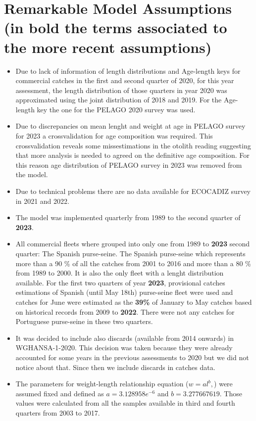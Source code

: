 \documentclass[review]{elsarticle}
\begin{document}
\section{Remarkable Model Assumptions (in bold the terms associated to the more recent assumptions)}\label{Remark}
\begin{itemize}
\item Due to lack of information of length distributions and Age-length keys for commercial catches in the first and second quarter of 2020, for this year assessment, the length distribution of those quarters in year 2020 was approximated using the joint distribution of 2018 and 2019. For the Age-length key the one for the PELAGO 2020 survey was used.
\item Due to discrepancies on mean lenght and weight at age in PELAGO survey for 2023 a crossvalidation for age composition was required. This crossvalidation reveals some missestimations in the otolith reading suggesting that more analysis is needed to agreed on the definitive age composition. For this reason age distribution of PELAGO survey in 2023 was removed from the model.
\item Due to technical problems there are no data available for ECOCADIZ survey in 2021 and 2022.
\item The model was implemented quarterly from 1989 to the second quarter of \textbf{2023}. 
\item All commercial fleets where grouped into only one from 1989 to \textbf{2023} second quarter: The Spanish purse-seine. The Spanish purse-seine which represents more than a 90 \% of all the catches from 2001 to 2016 and more than a 80 \% from 1989 to 2000. It is also the only fleet with a lenght distribution available. For the first two quarters of year \textbf{2023}, provisional catches estimations of Spanish (until May 18th) purse-seine fleet were used and catches for June were estimated as the \textbf{39\%} of January to May catches based on historical records from 2009 to \textbf{2022}. There were not any catches for Portuguese purse-seine in these two quarters. 
\item It was decided to include also discards (available from 2014 onwards) in WGHANSA-1-2020. This decision was taken because they were already accounted for some years in the previous assessments to 2020 but we did not notice about that. Since then we include discards in catches data.
\item The parameters for weight-length relationship equation ($w=al^b,$) were assumed fixed and defined as $a=3.128958e^{-6}$ and  $b=3.277667619.$  Those values were calculated from all the samples available in third and fourth quarters from 2003 to 2017.

\end{itemize}
\end{document}
